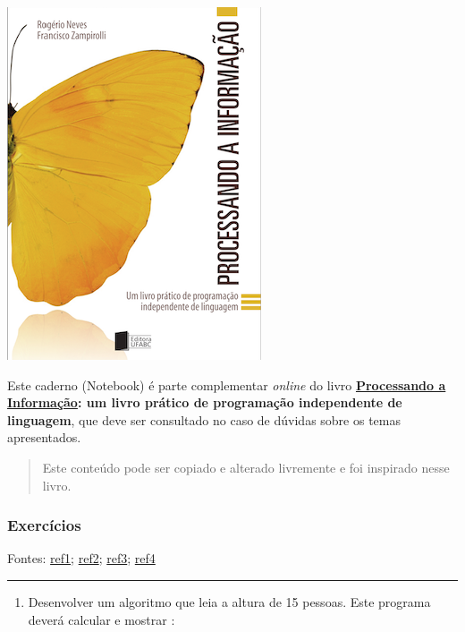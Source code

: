 \documentclass[12pt,a4paper]{article}
\providecommand{\tightlist}{%
      \setlength{\itemsep}{0pt}\setlength{\parskip}{0pt}}
\begin{document}
    \includegraphics{"figs/Capa_Processando_Informacao.jpg"}

Este caderno (Notebook) é parte complementar \emph{online} do livro
\textbf{\href{https://editora.ufabc.edu.br/matematica-e-ciencias-da-computacao/58-processando-a-informacao}{Processando
a Informação}: um livro prático de programação independente de
linguagem}, que deve ser consultado no caso de dúvidas sobre os temas
apresentados.

\begin{quote}
Este conteúdo pode ser copiado e alterado livremente e foi inspirado
nesse livro.
\end{quote}

    \hypertarget{exercuxedcios}{%
\subsubsection{Exercícios}\label{exercuxedcios}}

Fontes:
\href{https://docente.ifrn.edu.br/jonathanpereira/disciplinas/algoritmos/lista-de-exercicios-estruturas-de-repeticao-1/view}{ref1};
\href{https://www.inf.pucrs.br/flash/cbp/exwhile.html}{ref2};
\href{https://www.inf.pucrs.br/~pinho/LaproI/Exercicios/Repeticao/Lista1.htm}{ref3};
\href{https://pessoal.dainf.ct.utfpr.edu.br/leoneloalmeida/cursos/if71a-s83-2016-01/algoritmos_3_exerc.pdf}{ref4}

    \begin{center}\rule{0.5\linewidth}{0.5pt}\end{center}

\begin{enumerate}
\def\labelenumi{\arabic{enumi}.}
\tightlist
\item
  Desenvolver um algoritmo que leia a altura de 15 pessoas. Este
  programa deverá calcular e mostrar :
\end{enumerate}
\end{document}
